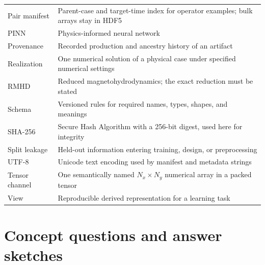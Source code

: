 \documentclass[11pt]{article}
\begin{document}
\begin{longtable}{p{}p{}}
Pair manifest & Parent-case and target-time index for operator examples; bulk arrays stay in HDF5 \\
PINN & Physics-informed neural network \\
Provenance & Recorded production and ancestry history of an artifact \\
Realization & One numerical solution of a physical case under specified numerical settings \\
RMHD & Reduced magnetohydrodynamics; the exact reduction must be stated \\
Schema & Versioned rules for required names, types, shapes, and meanings \\
SHA-256 & Secure Hash Algorithm with a 256-bit digest, used here for integrity \\
Split leakage & Held-out information entering training, design, or preprocessing \\
UTF-8 & Unicode text encoding used by manifest and metadata strings \\
Tensor channel & One semantically named $N_x\times N_y$ numerical array in a packed tensor \\
View & Reproducible derived representation for a learning task \\
\bottomrule
\end{longtable}

\section{Concept questions and answer sketches}
\label{app:questions}
\end{document}
